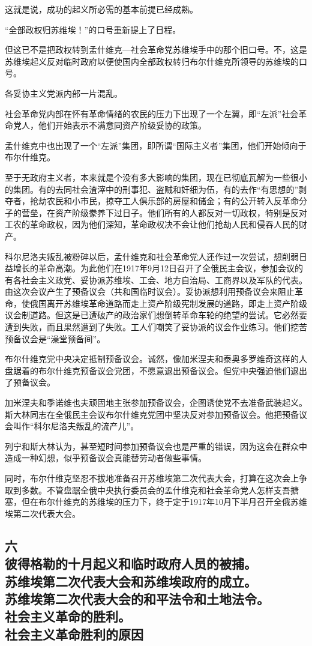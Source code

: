 这就是说，成功的起义所必需的基本前提已经成熟。

“全部政权归苏维埃！”的口号重新提上了日程。

但这已不是把政权转到孟什维克—社会革命党苏维埃手中的那个旧口号。不，这是苏维埃起义反对临时政府以便使国内全部政权转归布尔什维克所领导的苏维埃的口号。

各妥协主义党派内部一片混乱。

社会革命党内部在怀有革命情绪的农民的压力下出现了一个左翼，即“左派”社会革命党人，他们开始表示不满意同资产阶级妥协的政策。

孟什维克中也出现了一个“左派”集团，即所谓“国际主义者”集团，他们开始倾向于布尔什维克。

至于无政府主义者，本来就是个没有多大影响的集团，现在已彻底瓦解为一些很小的集团。有的去同社会渣滓中的刑事犯、盗贼和奸细为伍，有的去作“有思想的”剥夺者，抢劫农民和小市民，掠夺工人俱乐部的房屋和储金；有的公开转入反革命分子的营垒，在资产阶级豢养下过日子。他们所有的人都反对一切政权，特别是反对工农的革命政权，因为他们深知，革命政权决不会让他们抢劫人民和侵吞人民的财产。

科尔尼洛夫叛乱被粉碎以后，孟什维克和社会革命党人还作过一次尝试，想削弱日益增长的革命高潮。为此他们在1917年9月12日召开了全俄民主会议，参加会议的有各社会主义政党、妥协派苏维埃、工会、地方自治局、工商界以及军队的代表。由这次会议产生了预备议会（共和国临时议会）。妥协派想利用预备议会来阻止革命，使俄国离开苏维埃革命道路而走上资产阶级宪制发展的道路，即走上资产阶级议会制道路。但这是已遭破产的政治家们想倒转革命车轮的绝望的尝试。它必然要遭到失败，而且果然遭到了失败。工人们嘲笑了妥协派的议会作业练习。他们挖苦预备议会是“澡堂预备间”。

布尔什维克党中央决定抵制预备议会。诚然，像加米涅夫和泰奥多罗维奇这样的人盘踞着的布尔什维克预备议会党团，不愿意退出预备议会。但党中央强迫他们退出了预备议会。

加米涅夫和季诺维也夫顽固地主张参加预备议会，企图诱使党不去准备武装起义。斯大林同志在全俄民主会议布尔什维克党团中坚决反对参加预备议会。他把预备议会叫作“科尔尼洛夫叛乱的流产儿”。

列宁和斯大林认为，甚至短时间参加预备议会也是严重的错误，因为这会在群众中造成一种幻想，似乎预备议会真能替劳动者做些事情。

同时，布尔什维克坚忍不拔地准备召开苏维埃第二次代表大会，打算在这次会上争取到多数。不管盘踞全俄中央执行委员会的孟什维克和社会革命党人怎样支吾搪塞，但在布尔什维克的苏维埃的压力下，终于定于1917年10月下半月召开全俄苏维埃第二次代表大会。


\subsection[六\q 彼得格勒的十月起义和临时政府人员的被捕。苏维埃第二次代表大会和苏维埃政府的成立。苏维埃第二次代表大会的和平法令和土地法令。社会主义革命的胜利。社会主义革命胜利的原因]{六\\彼得格勒的十月起义和临时政府人员的被捕。\\苏维埃第二次代表大会和苏维埃政府的成立。\\苏维埃第二次代表大会的和平法令和土地法令。\\社会主义革命的胜利。\\社会主义革命胜利的原因}

